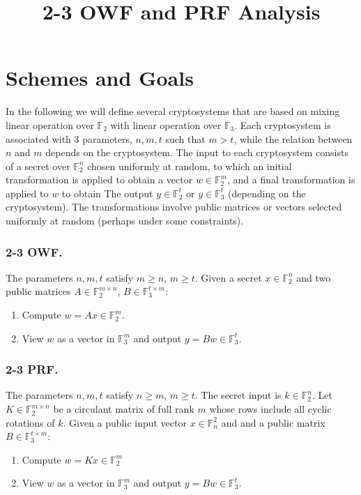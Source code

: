 \documentclass[orivec,envcountsect]{llncs}
\title{2-3 OWF and PRF Analysis}
\author{}
\institute{}
\begin{document}
\maketitle

\section{Schemes and Goals}

In the following we will define several cryptosystems that are based on mixing linear operation over
$\mathbb{F}_2$ with linear operation over $\mathbb{F}_3$.
Each cryptosystem is associated with 3 parameters, $n,m,t$ such that $m > t$,
while the relation between $n$ and $m$ depends on the cryptosystem.
The input to each cryptosystem consists of a secret over $\mathbb{F}_2^n$ chosen uniformly at random,
to which an initial transformation
is applied to obtain a vector $w \in \mathbb{F}_2^m$, and a final transformation is applied to $w$ to obtain
The output $y \in \mathbb{F}_2^t$ or $y\in \mathbb{F}_3^t$ (depending on the cryptosystem).
The transformations involve public matrices or vectors selected uniformly at random
(perhaps under some constraints).


\subsubsection{2-3 OWF.}

The parameters $n,m,t$ satisfy $m \geq n$, $m \geq t$.
Given a secret $x \in \mathbb{F}_2^n$ and
two public matrices $A \in \mathbb{F}_2^{m \times n}$,
$B \in \mathbb{F}_3^{t \times m}$:
\begin{enumerate}
  \item Compute $w = Ax \in \mathbb{F}_2^m$.
  \item View $w$ as a vector in $\mathbb{F}_3^m$ and output $y = Bw \in \mathbb{F}_3^t$.
\end{enumerate}

\subsubsection{2-3 PRF.}

The parameters $n,m,t$ satisfy $n \geq m$, $m \geq t$.
The secret input is $k \in \mathbb{F}_2^{n}$.
Let $K \in \mathbb{F}_2^{m \times n}$ be a circulant matrix of 
full rank $m$
whose rows include all cyclic rotations of $k$.
Given a public input vector $x \in \mathbb{F}^{2}_n$ and
and a public matrix $B \in \mathbb{F}_3^{t \times m}$:
\begin{enumerate}
  \item Compute $w = Kx \in \mathbb{F}_2^m$
  \item View $w$ as a vector in $\mathbb{F}_3^m$ and output $y = Bw \in \mathbb{F}_3^t$.
\end{enumerate}
\end{document}
